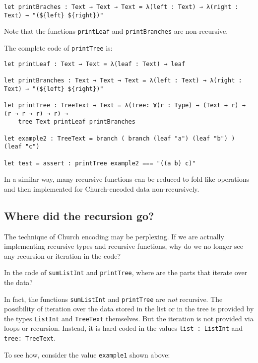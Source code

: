 \begin{lstlisting}[language=Dhall]
let printBraches : Text → Text → Text = λ(left : Text) → λ(right : Text) → "(${left} ${right})"
\end{lstlisting}


Note that the functions \lstinline!printLeaf! and \lstinline!printBranches! are non-recursive.


The complete code of \lstinline!printTree! is:


\begin{lstlisting}[language=Dhall]
let printLeaf : Text → Text = λ(leaf : Text) → leaf

let printBranches : Text → Text → Text = λ(left : Text) → λ(right : Text) → "(${left} ${right})"

let printTree : TreeText → Text = λ(tree: ∀(r : Type) → (Text → r) → (r → r → r) → r) →
    tree Text printLeaf printBranches

let example2 : TreeText = branch ( branch (leaf "a") (leaf "b") ) (leaf "c")    

let test = assert : printTree example2 === "((a b) c)"
\end{lstlisting}


In a similar way, many recursive functions can be reduced to fold-like operations and then implemented for Church-encoded data non-recursively.


\subsection{Where did the recursion go?}


The technique of Church encoding may be perplexing.
If we are actually implementing recursive types and recursive functions, why do we no longer see any recursion or iteration in the code?


In the code of \lstinline!sumListInt! and \lstinline!printTree!, where are the parts that iterate over the data?


In fact, the functions \lstinline!sumListInt! and \lstinline!printTree! are \emph{not} recursive.
The possibility of iteration over the data stored in the list or in the tree is provided by the types \lstinline!ListInt! and \lstinline!TreeText! themselves.
But the iteration is not provided via loops or recursion.
Instead, it is hard-coded in the values \lstinline!list : ListInt! and \lstinline!tree: TreeText!.


To see how, consider the value \lstinline!example1! shown above:


